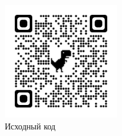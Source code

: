 
\begin{figure}
    \includegraphics[width=5cm]{inc/qrcode_github.com.png}
    \caption{Исходный код}
    \label{fig:qrcode}
\end{figure}
